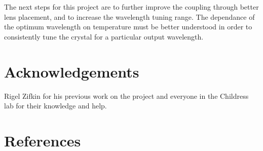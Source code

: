 \documentclass[9pt,twocolumn,twoside]{pnas-new}
\begin{document}
The next steps for this project are to further improve the coupling through better lens placement, and to increase the wavelength tuning range. The dependance of the optimum wavelength on temperature must be better understood in order to consistently tune the crystal for a particular output wavelength. 

\section*{Acknowledgements}
Rigel Zifkin for his previous work on the project and everyone in the Childress lab for their knowledge and help. 

	
\pnasbreak
\section*{References}



\end{document}
